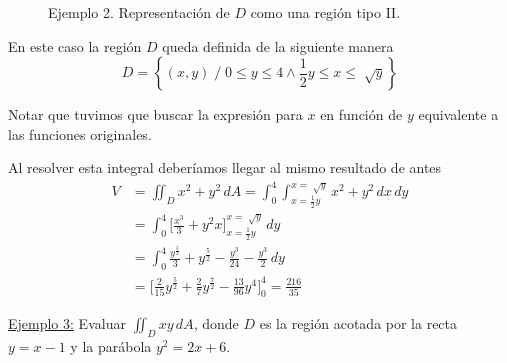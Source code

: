 \documentclass[12pt]{article}
\begin{document}
\begin{figure}[H]
  \centering
  {\large }
  \caption{Ejemplo 2. Representación de $ D $ como una región tipo II.}
  \label{grf:integral-doble-ej2-2}
\end{figure}

En este caso la región $ D $ queda definida de la siguiente manera
\[
  D=\left\{(x,y) \;/\; 0\leq y\leq 4 \land \frac{1}{2}y\leq x\leq \sqrt[]{y}\right\}
\]

Notar que tuvimos que buscar la expresión para $ x $ en función de $ y $ equivalente a las funciones originales.

Al resolver esta integral deberíamos llegar al mismo resultado de antes
\begin{align*}
  V &= \iint_{D} x^2+y^2 \,dA = \int_{0}^{4} \int_{x=\frac{1}{2}y}^{x=\sqrt[]{y}} x^2+y^2 \,dx\,dy\\
   &= \int_{0}^{4} \Bigg[\frac{x^3}{3}+y^2x\Bigg]_{x=\frac{1}{2}y}^{x=\sqrt[]{y}} \,dy\\
   &= \int_{0}^{4} \frac{y^{\frac{3}{2}}}{3}+y^{\frac{5}{2}}-\frac{y^3}{24}-\frac{y^3}{2} \,dy\\
   &= \Bigg[\frac{2}{15}y^\frac{5}{2}+\frac{2}{7}y^\frac{7}{2}-\frac{13}{96}y^4\Bigg]_{0}^{4} = \frac{216}{35}
\end{align*}

\underline{Ejemplo 3:} Evaluar $ \iint_{D} xy \,dA $, donde $ D $ es la región acotada por la recta $ y=x-1 $ y la parábola $ y^2=2x+6 $.
\end{document}
